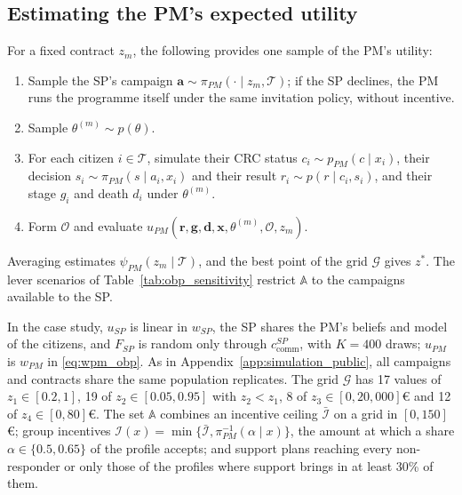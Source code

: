 \documentclass[12pt]{article}
\begin{document}
\subsection{Estimating the PM's expected utility}\label{app:simulation_OBP_utility}
For a fixed contract $z_m$, the following provides one sample of the PM's utility:
\begin{enumerate}
    \item Sample the SP's campaign $\mathbf{a} \sim \pi_{PM}(\cdot \mid z_m, \mathcal{T})$; if the SP declines, the PM runs the programme itself under the same invitation policy, without incentive.
  \item Sample $\theta^{(m)} \sim p(\theta)$.
  \item For each citizen $i \in \mathcal{T}$, simulate their CRC status $c_i \sim p_{PM}(c \mid x_i)$, their decision $s_i \sim \pi_{PM}(s \mid a_i, x_i)$ and their result $r_i \sim p(r \mid c_i, s_i)$, and their stage $g_i$ and death $d_i$ under $\theta^{(m)}$.
  \item Form $\mathcal{O}$ and evaluate $u_{PM}(\mathbf{r}, \mathbf{g}, \mathbf{d}, \mathbf{x}, \theta^{(m)}, \mathcal{O}, z_m)$.
\end{enumerate}
Averaging estimates $\psi_{PM}(z_m \mid \mathcal{T})$, and the best point of the grid $\mathcal{G}$ gives $z^*$. The lever scenarios of Table~\ref{tab:obp_sensitivity} restrict $\mathbb{A}$ to the campaigns available to the SP.

In the case study, $u_{SP}$ is linear in $w_{SP}$, the SP shares the PM's beliefs and model of the citizens, and $F_{SP}$ is random only through $c^{SP}_{\text{comm}}$, with $K = 400$ draws; $u_{PM}$ is $w_{PM}$ in \eqref{eq:wpm_obp}. As in Appendix~\ref{app:simulation_public}, all campaigns and contracts share the same population replicates. The grid $\mathcal{G}$ has 17 values of $z_1 \in [0.2, 1]$, 19 of $z_2 \in [0.05, 0.95]$ with $z_2 < z_1$, 8 of $z_3 \in [0, 20{,}000]$€ and 12 of $z_4 \in [0, 80]$€. The set $\mathbb{A}$ combines an incentive ceiling $\bar{\mathcal{I}}$ on a grid in $[0, 150]$€; group incentives $\mathcal{I}(x) = \min\{\bar{\mathcal{I}}, \pi_{PM}^{-1}(\alpha \mid x)\}$, the amount at which a share $\alpha \in \{0.5, 0.65\}$ of the profile accepts; and support plans reaching every non-responder or only those of the profiles where support brings in at least 30\% of them.
\end{document}
